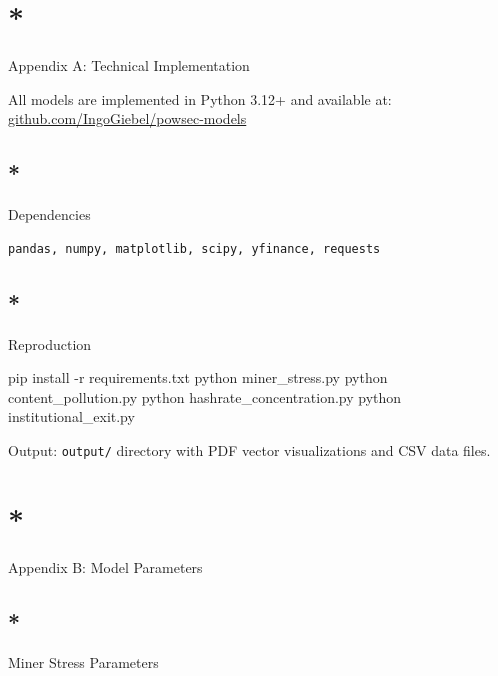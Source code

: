 \documentclass[
  11pt,
]{article}
\newenvironment{Shaded}{\begin{snugshade}}{\end{snugshade}}
\newcommand{\AttributeTok}[1]{\textcolor[rgb]{0.40,0.45,0.13}{#1}}
\newcommand{\ExtensionTok}[1]{\textcolor[rgb]{0.00,0.23,0.31}{#1}}
\newcommand{\NormalTok}[1]{\textcolor[rgb]{0.00,0.23,0.31}{#1}}
\let\oldsection\section
\renewcommand{\section}[1]{\FloatBarrier\oldsection{#1}}
\let\oldsubsection\subsection
\renewcommand{\subsection}[1]{\FloatBarrier\oldsubsection{#1}}
\begin{document}
\hypertarget{appendix-a-technical-implementation}{%
\section*{Appendix A: Technical
Implementation}\label{appendix-a-technical-implementation}}

All models are implemented in Python 3.12+ and available at:
\href{https://github.com/IngoGiebel/powsec-models}{github.com/IngoGiebel/powsec-models}

\hypertarget{dependencies}{%
\subsection*{Dependencies}\label{dependencies}}

\begin{verbatim}
pandas, numpy, matplotlib, scipy, yfinance, requests
\end{verbatim}

\hypertarget{reproduction}{%
\subsection*{Reproduction}\label{reproduction}}

\begin{Shaded}
\begin{Highlighting}[]
\ExtensionTok{pip}\NormalTok{ install }\AttributeTok{{-}r}\NormalTok{ requirements.txt}
\ExtensionTok{python}\NormalTok{ miner\_stress.py}
\ExtensionTok{python}\NormalTok{ content\_pollution.py}
\ExtensionTok{python}\NormalTok{ hashrate\_concentration.py}
\ExtensionTok{python}\NormalTok{ institutional\_exit.py}
\end{Highlighting}
\end{Shaded}

Output: \texttt{output/} directory with PDF vector visualizations and
CSV data files.

\hypertarget{appendix-b-model-parameters}{%
\section*{Appendix B: Model
Parameters}\label{appendix-b-model-parameters}}

\hypertarget{miner-stress-parameters}{%
\subsection*{Miner Stress Parameters}\label{miner-stress-parameters}}
\end{document}
